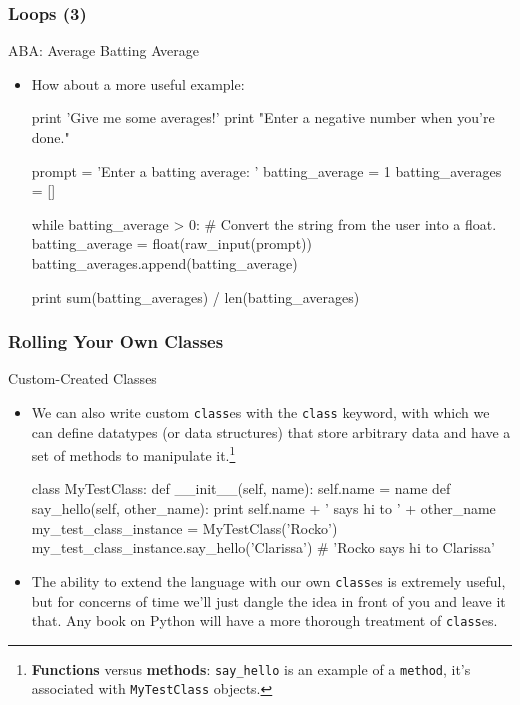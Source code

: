 \documentclass[10pt]{beamer}
\begin{document}
\begin{frame}[fragile]
  \frametitle{Loops (3)}
  \begin{block}{ABA: Average Batting Average}
    \begin{itemize}
      \item How about a more useful example:
        \begin{pythoncode}
  print 'Give me some averages!'
  print "Enter a negative number when you're done."

  prompt = 'Enter a batting average: '
  batting_average = 1
  batting_averages = []

  while batting_average > 0:
    # Convert the string from the user into a float.
    batting_average = float(raw_input(prompt))
    batting_averages.append(batting_average)

  print sum(batting_averages) / len(batting_averages)
        \end{pythoncode}
    \end{itemize}
  \end{block}
\end{frame}




\begin{frame}[fragile]
  \frametitle{Rolling Your Own Classes}
  \begin{block}{Custom-Created Classes}
    \begin{itemize}
      \item We can also write custom \texttt{class}es with the \texttt{class} keyword, with which we can define datatypes (or data structures) that store arbitrary data and have a set of methods to manipulate it.\footnote{\textbf{Functions} versus \textbf{methods}: \texttt{say\_hello} is an example of a \texttt{method}, it's associated with \texttt{MyTestClass} objects.}
        \footnotesize
        \begin{pythoncode}
  class MyTestClass:
    def __init__(self, name):
      self.name = name
    def say_hello(self, other_name):
      print self.name + ' says hi to ' + other_name
  my_test_class_instance = MyTestClass('Rocko')
  my_test_class_instance.say_hello('Clarissa')
  # 'Rocko says hi to Clarissa'
        \end{pythoncode}
      \normalsize
      \item The ability to extend the language with our own \texttt{class}es is extremely useful, but for concerns of time we'll just dangle the idea in front of you and leave it that.
        Any book on Python will have a more thorough treatment of \texttt{class}es.
    \end{itemize}
  \end{block}
\end{frame}
      
\end{document}
